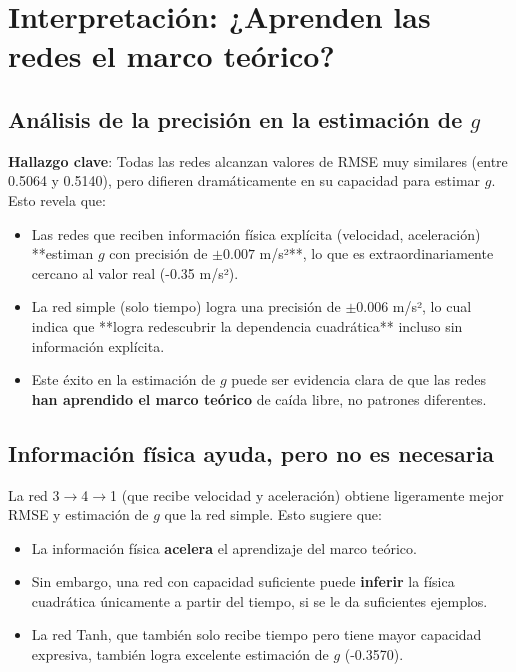 \documentclass[11pt]{article}
\begin{document}
	\section{Interpretación: ¿Aprenden las redes el marco teórico?}
	
	\subsection{Análisis de la precisión en la estimación de $g$}
	\textbf{Hallazgo clave}: Todas las redes alcanzan valores de RMSE muy similares (entre 0.5064 y 0.5140), pero difieren dramáticamente en su capacidad para estimar $g$. Esto revela que:
	
	\begin{itemize}
		\item Las redes que reciben información física explícita (velocidad, aceleración) **estiman $g$ con precisión de $\pm 0.007$ m/s²**, lo que es extraordinariamente cercano al valor real (-0.35 m/s²).
		\item La red simple (solo tiempo) logra una precisión de $\pm 0.006$ m/s², lo cual indica que **logra redescubrir la dependencia cuadrática** incluso sin información explícita.
		\item Este éxito en la estimación de $g$ puede ser evidencia clara de que las redes \textbf{han aprendido el marco teórico} de caída libre, no patrones diferentes.
	\end{itemize}
	
	\subsection{Información física ayuda, pero no es necesaria}
	La red 3$\rightarrow$4$\rightarrow$1 (que recibe velocidad y aceleración) obtiene ligeramente mejor RMSE y estimación de $g$ que la red simple. Esto sugiere que:
	\begin{itemize}
		\item La información física \textbf{acelera} el aprendizaje del marco teórico.
		\item Sin embargo, una red con capacidad suficiente puede \textbf{inferir} la física cuadrática únicamente a partir del tiempo, si se le da suficientes ejemplos.
		\item La red Tanh, que también solo recibe tiempo pero tiene mayor capacidad expresiva, también logra excelente estimación de $g$ (-0.3570).
	\end{itemize}
	
\end{document}
